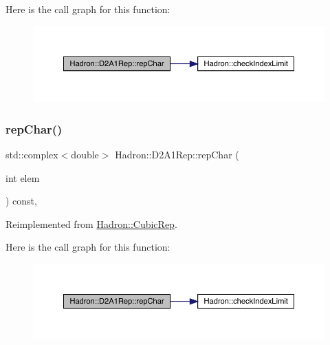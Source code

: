 Here is the call graph for this function\+:
\nopagebreak
\begin{figure}[H]
\begin{center}
\leavevmode
\includegraphics[width=350pt]{d5/d28/structHadron_1_1D2A1Rep_a6c72d27c96ff1d69632ebb7732955c54_cgraph}
\end{center}
\end{figure}
\mbox{\label{structHadron_1_1D2A1Rep_a6c72d27c96ff1d69632ebb7732955c54}} 
\subsubsection{\texorpdfstring{repChar()}{repChar()}\hspace{0.1cm}{\footnotesize\ttfamily [2/2]}}
{\footnotesize\ttfamily std\+::complex$<$double$>$ Hadron\+::\+D2\+A1\+Rep\+::rep\+Char (\begin{DoxyParamCaption}\item[{int}]{elem }\end{DoxyParamCaption}) const\hspace{0.3cm}{\ttfamily [inline]}, {\ttfamily [virtual]}}



Reimplemented from \mbox{\hyperlink{structHadron_1_1CubicRep_af45227106e8e715e84b0af69cd3b36f8}{Hadron\+::\+Cubic\+Rep}}.

Here is the call graph for this function\+:
\nopagebreak
\begin{figure}[H]
\begin{center}
\leavevmode
\includegraphics[width=350pt]{d5/d28/structHadron_1_1D2A1Rep_a6c72d27c96ff1d69632ebb7732955c54_cgraph}
\end{center}
\end{figure}
\mbox{\label{structHadron_1_1D2A1Rep_a0d9bec731ada6fec10956dce667b2ffd}} 
